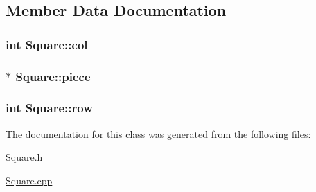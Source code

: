 \subsection{Member Data Documentation}
\hypertarget{classSquare_a08d4af37ead0391bec8f9cbaff083da0}{}
\subsubsection[{col}]{\setlength{\rightskip}{0pt plus 5cm}int Square\+::col}\label{classSquare_a08d4af37ead0391bec8f9cbaff083da0}
\hypertarget{classSquare_a52eab334fb3f4fe8d29f1f1b7570a52f}{}
\subsubsection[{piece}]{$\ast$ Square\+::piece}\label{classSquare_a52eab334fb3f4fe8d29f1f1b7570a52f}
\hypertarget{classSquare_aa353950a9ef437401db55ae605b0f8b9}{}
\subsubsection[{row}]{\setlength{\rightskip}{0pt plus 5cm}int Square\+::row}\label{classSquare_aa353950a9ef437401db55ae605b0f8b9}


The documentation for this class was generated from the following files\+:\begin{DoxyCompactItemize}
\item 
\hyperlink{Square_8h}{Square.\+h}\item 
\hyperlink{Square_8cpp}{Square.\+cpp}\end{DoxyCompactItemize}
